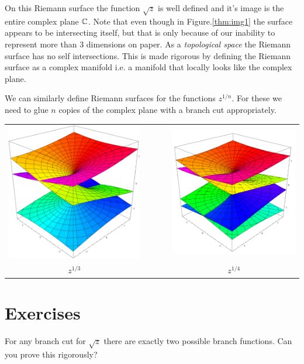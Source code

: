 On this Riemann surface the function $\sqrt{z}$ is well defined and it's image is the entire complex plane $\mathbb{C}$. Note that even though in Figure.\ref{thm:img1} the surface appears to be intersecting itself, but that is only because of our inability to represent more than 3 dimensions on paper. As a \emph{topological space} the Riemann surface has no self intersections. This is made rigorous by defining the Riemann surface as a complex manifold i.e. a manifold that locally looks like the complex plane.

We can similarly define Riemann surfaces for the functions $z^{1/n}$. For these we need to glue $n$ copies of the complex plane with a branch cut appropriately.\\
\begin{center}
	\begin{tabular}{ccc}
		\includegraphics[width=0.35\linewidth]{images/cube_root} & $\qquad$ &
		\includegraphics[width=0.35\linewidth]{images/4th_root} \\
		$z^{1/3}$                                                &          & $z^{1/4}$
	\end{tabular}
\end{center}



\section{Exercises}

\begin{exercise}
	\label{thm:ex1}
	For any branch cut for $\sqrt{z}$ there are exactly two possible branch functions. Can you prove this rigorously?
\end{exercise}

